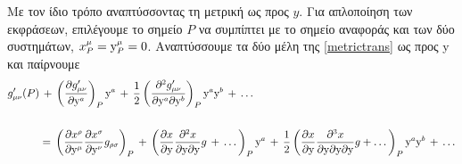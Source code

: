 Με τον ίδιο τρόπο αναπτύσσοντας τη μετρική ως προς $y$. 
Για απλοποίηση των εκφράσεων, επιλέγουμε το σημείο $P$ να συμπίπτει με το σημείο αναφοράς και των δύο συστημάτων, $x\superscr{\mu}\subscr{P} = \y\superscr{\mu}\subscr{P}=0$.  Αναπτύσσουμε τα δύο μέλη της \eqref{metrictrans} 
ως προς y και παίρνουμε
\begin{equation}\label{tayloroftrans}
    \begin{split}
        \g{\mu}{\nu}'(P) &\,+\, \left( \pd{\g{\mu}{\nu}'}{\y\superscr{a}} \right)_P  \y\superscr{a} \,+\, \frac{1}{2}\left( \spd{\g{\mu}{\nu}'}{\y\superscr{a}}{\y\superscr{b}} \right)_P \y\superscr{a}\y\superscr{b} \,+\,\dots \\ \\
        &=\, \left( \pd{x\superscr{\rho}}{\y\superscr{\mu}}\pd{x\superscr{\sigma}}{\y\superscr{\nu}}\g{\rho}{\sigma} \right)_P \,+\, \left( \pd{x}{\y}\spd{x}{\y}{\y}g \,+\, \dots \right)_P  \y\superscr{a} \,+\, \frac{1}{2}\left( \frac{\partial x}{\partial\y}\frac{\partial\superscr{3}x}{\partial\y\partial\y\partial\y}g + \dots \right)_P \y\superscr{a}\y\superscr{b}\,+\,\dots
    \end{split}
\end{equation}

